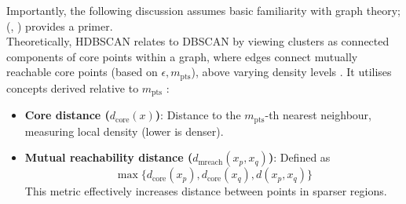 \documentclass[10pt,oneside]{report}
\renewcommand{\citet}[1]{\citeauthor{#1}, \citeyear{#1}}
\begin{document}
Importantly, the following discussion assumes basic familiarity with graph theory; (\citet{harris2008combinatorics}) provides a primer. \\


\noindent Theoretically, HDBSCAN relates to DBSCAN by viewing clusters as connected components of core points within a graph, where edges connect mutually reachable core points (based on $\epsilon, m_{\text{pts}}$), above varying density levels \cite{campello2013density}.
It utilises concepts derived relative to $m_{\text{pts}}$ \cite{campello2013density}:
\begin{itemize}
    \item \textbf{Core distance ($d_{\text{core}}(x)$)}: Distance to the $m_{\text{pts}}$-th nearest neighbour, measuring local density (lower is denser).
    \item \textbf{Mutual reachability distance ($d_{\text{mreach}}(x_p, x_q)$)}: Defined as \[\max \{ d_{\text{core}}(x_p), d_{\text{core}}(x_q), d(x_p, x_q) \}\]This metric effectively increases distance between points in sparser regions.
\end{itemize}

\end{document}
